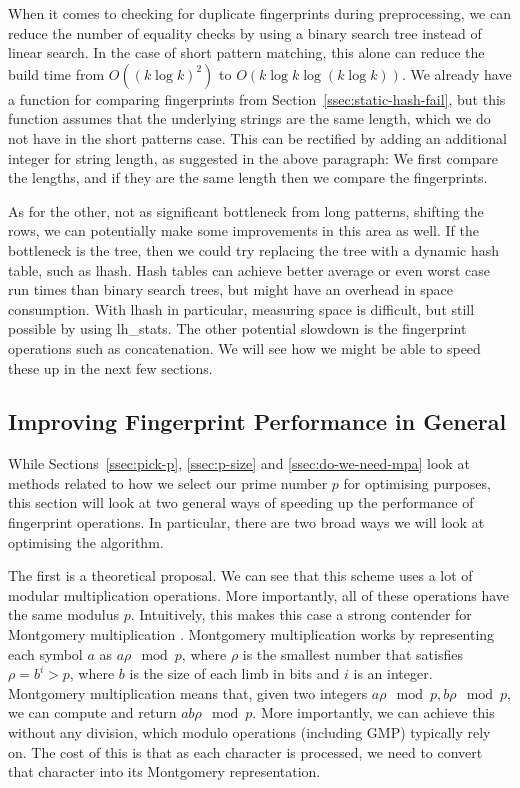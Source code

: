 \documentclass[ %
                    author={Dominic Joseph Moylett},
                    degree={MEng},
                     title={Dictionary Matching with Fingerprints},
                  subtitle={An Empirical Analysis},
                      type={research},
                      year={2015} ]{dissertation}
\begin{document}
When it comes to checking for duplicate fingerprints during preprocessing, we can reduce the number of equality checks by using a binary search tree instead of linear search. In the case of short pattern matching, this alone can reduce the build time from $O((k\log k)^2)$ to $O(k\log k\log(k\log k))$. We already have a function for comparing fingerprints from Section~\ref{ssec:static-hash-fail}, but this function assumes that the underlying strings are the same length, which we do not have in the short patterns case. This can be rectified by adding an additional integer for string length, as suggested in the above paragraph: We first compare the lengths, and if they are the same length then we compare the fingerprints.

As for the other, not as significant bottleneck from long patterns, shifting the rows, we can potentially make some improvements in this area as well. If the bottleneck is the tree, then we could try replacing the tree with a dynamic hash table, such as lhash\cite{website:openssl-lhash}. Hash tables can achieve better average or even worst case run times than binary search trees, but might have an overhead in space consumption. With lhash in particular, measuring space is difficult, but still possible by using lh\_stats\cite{website:openssl-lhstats}. The other potential slowdown is the fingerprint operations such as concatenation. We will see how we might be able to speed these up in the next few sections.

\subsection{Improving Fingerprint Performance in General}

While Sections~\ref{ssec:pick-p}, \ref{ssec:p-size} and \ref{ssec:do-we-need-mpa} look at methods related to how we select our prime number $p$ for optimising purposes, this section will look at two general ways of speeding up the performance of fingerprint operations. In particular, there are two broad ways we will look at optimising the algorithm.

The first is a theoretical proposal. We can see that this scheme uses a lot of modular multiplication operations. More importantly, all of these operations have the same modulus $p$. Intuitively, this makes this case a strong contender for Montgomery multiplication \cite{montgomery:multiplication}. Montgomery multiplication works by representing each symbol $a$ as $a\rho \mod p$, where $\rho$ is the smallest number that satisfies $\rho = b^i > p$, where $b$ is the size of each limb in bits and $i$ is an integer. Montgomery multiplication means that, given two integers $a\rho\mod p, b\rho\mod p$, we can compute and return $ab\rho\mod p$. More importantly, we can achieve this without any division, which modulo operations (including GMP) typically rely on. The cost of this is that as each character is processed, we need to convert that character into its Montgomery representation.
\end{document}
